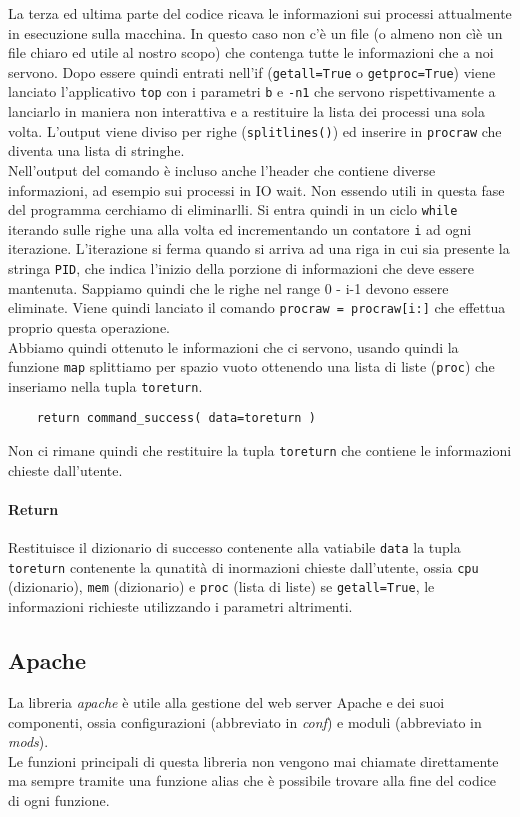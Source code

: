 \documentclass[11pt]{article}
\begin{document}
La terza ed ultima parte del codice ricava le informazioni sui processi attualmente in esecuzione sulla macchina.
In questo caso non c'è un file (o almeno non cìè un file chiaro ed utile al nostro scopo) che contenga tutte le informazioni
che a noi servono. Dopo essere quindi entrati nell'if (\texttt{getall=True} o \texttt{getproc=True}) viene lanciato
l'applicativo \texttt{top} con i parametri \texttt{b} e \texttt{-n1} che servono rispettivamente a lanciarlo in maniera
non interattiva e a restituire la lista dei processi una sola volta. L'output viene diviso per righe (\texttt{splitlines()})
ed inserire in \texttt{procraw} che diventa una lista di stringhe.\\
Nell'output del comando è incluso anche l'header che contiene diverse informazioni, ad esempio sui processi in IO wait.
Non essendo utili in questa fase del programma cerchiamo di eliminarlli. Si entra quindi in un ciclo \texttt{while}
iterando sulle righe una alla volta ed incrementando un contatore \texttt{i} ad ogni iterazione. L'iterazione si ferma
quando si arriva ad una riga in cui sia presente la stringa \texttt{PID}, che indica l'inizio della porzione di informazioni
che deve essere mantenuta. Sappiamo quindi che le righe nel range 0 - i-1 devono essere eliminate. Viene quindi lanciato
il comando \texttt{procraw = procraw[i:]} che effettua proprio questa operazione.\\
Abbiamo quindi ottenuto le informazioni che ci servono, usando quindi la funzione \texttt{map} splittiamo per spazio vuoto
ottenendo una lista di liste (\texttt{proc}) che inseriamo nella tupla \texttt{toreturn}.
\begin{lstlisting}
    return command_success( data=toreturn )
\end{lstlisting}
Non ci rimane quindi che restituire la tupla \texttt{toreturn} che contiene le informazioni chieste dall'utente.
\paragraph{Return}
Restituisce il dizionario di successo contenente alla vatiabile \texttt{data} la tupla \texttt{toreturn} contenente la qunatità
di inormazioni chieste dall'utente, ossia \texttt{cpu} (dizionario), \texttt{mem} (dizionario) e \texttt{proc} (lista di liste)
se \texttt{getall=True}, le informazioni richieste utilizzando i parametri altrimenti.


\subsection{Apache}\label{apache}
La libreria \textit{apache} è utile alla gestione del web server Apache e dei suoi componenti, ossia configurazioni
(abbreviato in \textit{conf}) e moduli (abbreviato in \textit{mods}).\\
Le funzioni principali di questa libreria non vengono mai chiamate direttamente ma sempre tramite una funzione alias
che è possibile trovare alla fine del codice di ogni funzione.
\end{document}
